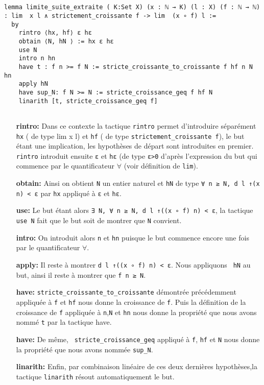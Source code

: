 \documentclass[a4paper, 12pt]{article}
\newcommand{\lean}[1]{\texttt{#1}}
\begin{document}
\begin{verbatim}    
    

lemma limite_suite_extraite ( K:Set X) (x : ℕ → K) (l : X) (f : ℕ → ℕ) : lim  x l ∧ strictement_croissante f -> lim  (x ∘ f) l :=
  by
    rintro ⟨hx, hf⟩ ε hε
    obtain ⟨N, hN ⟩ := hx ε hε
    use N
    intro n hn
    have t : f n >= f N := stricte_croissante_to_croissante f hf n N hn
    apply hN
    have sup_N: f N >= N := stricte_croissance_geq f hf N
    linarith [t, stricte_croissance_geq f]
    
\end{verbatim}
\begin{itemize} [  align=left,  itemsep=20pt ]

    \item [\textbf{rintro:}] Dans ce contexte la tactique \lean{rintro} permet d'introduire séparément \lean{hx} ( de type lim x l) et \lean{hf} ( de type \lean{strictement_croissante
    f}), le but étant une implication, les hypothèses de départ sont introduites en premier. \lean{rintro} introduit ensuite \lean{ε} et \lean{hε} (de type \lean{ε>0} d'après
    l'expression du but qui commence par le quantificateur $\forall$ (voir définition de \lean{lim}).

    \item [\textbf{obtain:}] Ainsi on obtient \lean{N} un entier naturel et \lean{hN} de type \lean{∀ n ≥ N, d l ↑(x n) < ε} par \lean{hx} appliqué à \lean{ε} et \lean{hε}.

    \item [\textbf{use:}] Le but étant alors \lean{∃ N, ∀ n ≥ N, d l ↑((x ∘ f) n) < ε}, la tactique \lean{ use N} fait que le but soit de montrer que \lean{N} convient. 

    \item [\textbf{intro:}] On introduit alors \lean{n} et \lean{hn} puisque le but commence encore une fois par le quantificateur $\forall$. 

    \item [\textbf{apply:}] Il reste à montrer \lean{d l ↑((x ∘ f) n) < ε}. Nous appliquons \lean{ hN} au but, ainsi il reste à montrer que \lean{f n ≥ N}. 

    \item [\textbf{have:}] \lean{stricte_croissante_to_croissante} démontrée précédemment appliquée à \lean{f} et \lean{hf} nous donne la croissance de \lean{f}. Puis la définition de
    la croissance de \lean{f} appliquée à \lean{n},\lean{N} et \lean{hn} nous donne la propriété que nous avons nommé \lean{t} par la tactique have.

    \item [\textbf{have:}] De même, \lean{ stricte_croissance_geq} appliqué à \lean{f}, \lean{hf} et \lean{N} nous donne la propriété que nous avons nommée \lean{sup_N}.

    \item [\textbf{linarith:}] Enfin, par combinaison linéaire de ces deux dernières hypothèses,la tactique \lean{linarith} résout automatiquement le but.

\end{itemize}
\end{document}
